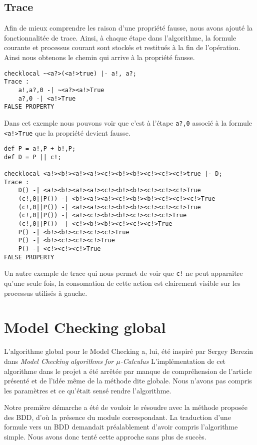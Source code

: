 \documentclass[a4paper]{article}
\begin{document}
\subsection{Trace}

Afin de mieux comprendre les raison d'une propriété fausse, nous avons
ajouté la fonctionnalitée de trace. Ainsi, à chaque étape dans
l'algorithme, la formule courante et processus courant sont stockés et
restitués à la fin de l'opération. Ainsi nous obtenons le chemin qui
arrive à la propriété fausse.

\begin{verbatim}
checklocal ~<a?>(<a!>true) |- a!, a?;
Trace : 
	a!,a?,0 -| ~<a?><a!>True
	a?,0 -| <a!>True
FALSE PROPERTY
\end{verbatim}

Dans cet exemple nous pouvons voir que c'est à
l'étape \verb|a?,0| associé à la
formule \verb|<a!>True| que la propriété devient fausse.

\begin{verbatim}
def P = a!,P + b!,P;
def D = P || c!;

checklocal <a!><b!><a!><a!><c!><b!><b!><c!><c!><c!>true |- D;
Trace : 
	D() -| <a!><b!><a!><a!><c!><b!><b!><c!><c!><c!>True
	(c!,0||P()) -| <b!><a!><a!><c!><b!><b!><c!><c!><c!>True
	(c!,0||P()) -| <a!><a!><c!><b!><b!><c!><c!><c!>True
	(c!,0||P()) -| <a!><c!><b!><b!><c!><c!><c!>True
	(c!,0||P()) -| <c!><b!><b!><c!><c!><c!>True
	P() -| <b!><b!><c!><c!><c!>True
	P() -| <b!><c!><c!><c!>True
	P() -| <c!><c!><c!>True
FALSE PROPERTY
\end{verbatim}

Un autre exemple de trace qui nous permet de voir que \verb|c!| ne
peut apparaitre qu'une seule fois, la consomation de cette action est
clairement visible sur les processus utilisés à gauche.

\section{Model Checking global}

L'algorithme global pour le Model Checking a, lui, été inspiré par
Sergey Berezin dans \emph{Model Checking algorithms for
$\mu$-Calculus} L'implémentation de cet algorithme dans le projet a
été arrêtée par manque de compréhension de l'article présenté et de
l'idée même de la méthode dite globale. Nous n'avons pas compris les
paramètres et ce qu'était sensé rendre l'algorithme.

Notre première démarche a été de vouloir le résoudre avec la méthode
proposée des BDD, d'où la présence du module correspondant. La
traduction d'une formule vers un BDD demandait préalablement d'avoir
compris l'algorithme simple. Nous avons donc tenté cette approche sans
plus de succès.
\end{document}
